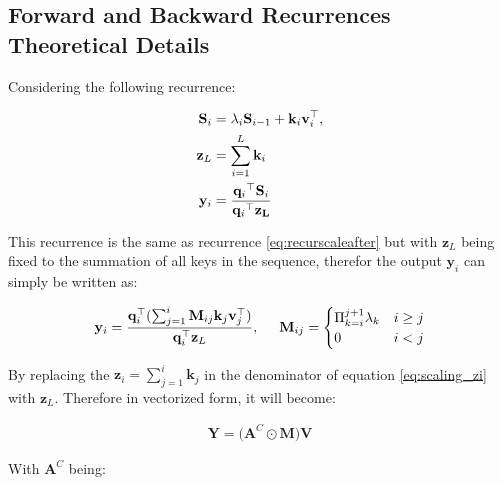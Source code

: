 \subsection{Forward and Backward Recurrences Theoretical Details}

Considering the following recurrence:

\begin{align}
    \mathbf{S}_i &= \textcolor{black}{{\lambda_i}} \mathbf{S}_{i-1} + \mathbf{k}_i \mathbf{v}_i^{\top}, \\
    \mathbf{z}_L & = \sum^{L}_{i=1} \mathbf{k}_i \\
    \mathbf{y}_i &= \frac{{{\mathbf{q}_i}}^{\top} \mathbf{S}_i}{{{\mathbf{q}_i}}^{\top} \mathbf{z_L}} 
    \label{eq:forzl}
\end{align}

This recurrence is the same as recurrence \eqref{eq:recurscaleafter} but with $\mathbf{z}_L$ being fixed to the summation of all keys in the sequence, therefor the output $\mathbf{y}_i$ can simply be written as:

\begin{minipage}[t]{1\textwidth}  
\begin{align}
\label{eq:dumyrec}
\mathbf{y}_i = \frac{\mathbf{q}^{\top}_i(\sum_{j=1}^i \mathbf{M}_{ij}\mathbf{k}_j\mathbf{v}^{\top}_j)}{\mathbf{q}^{\top}_i\mathbf{z}_L},  \hspace{5mm}   \mathbf{M}_{ij} = 
    \begin{cases} 
    \Pi_{k=i}^{j+1}{\lambda_k} & i \geq j  \\
    0 & i < j
\end{cases}
\end{align}
\end{minipage}

By replacing the $\mathbf{z}_i = \sum_{j=1}^i \mathbf{k}_j$ in the denominator of equation \eqref{eq:scaling_zi} with $\mathbf{z}_L$. Therefore in vectorized form, it will become:

\begin{align}
   \mathbf{Y} = (\mathbf{A}^{C}  \odot \mathbf{M}\big) \mathbf{V}
\end{align}

With $\mathbf{A}^{C}$ being:

